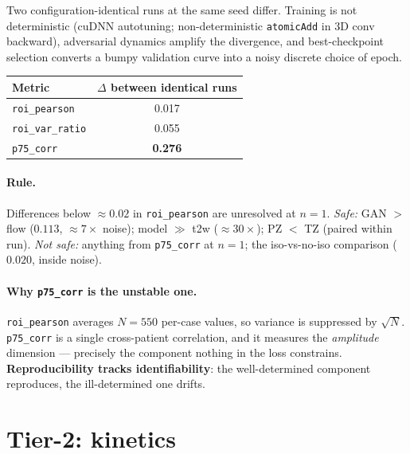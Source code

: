 \documentclass[11pt]{article}
\newcommand{\1}{\mathbb{1}}
\begin{document}
Two configuration-identical runs at the same seed differ. Training is not deterministic
(cuDNN autotuning; non-deterministic \texttt{atomicAdd} in 3D conv backward), adversarial
dynamics amplify the divergence, and best-checkpoint selection converts a bumpy validation
curve into a noisy discrete choice of epoch.

\begin{center}
\begin{tabular}{lc}
\toprule
Metric & $\Delta$ between identical runs \\
\midrule
\texttt{roi\_pearson} & 0.017 \\
\texttt{roi\_var\_ratio} & 0.055 \\
\texttt{p75\_corr} & \textbf{0.276} \\
\bottomrule
\end{tabular}
\end{center}

\paragraph{Rule.} Differences below $\approx0.02$ in \texttt{roi\_pearson} are unresolved at
$n=1$. \emph{Safe:} GAN $>$ flow ($0.113$, $\approx7\times$ noise); model $\gg$ t2w
($\approx30\times$); PZ $<$ TZ (paired within run). \emph{Not safe:} anything from
\texttt{p75\_corr} at $n=1$; the iso-vs-no-iso comparison ($0.020$, inside noise).

\paragraph{Why \texttt{p75\_corr} is the unstable one.} \texttt{roi\_pearson} averages $N=550$
per-case values, so variance is suppressed by $\sqrt{N}$. \texttt{p75\_corr} is a single
cross-patient correlation, and it measures the \emph{amplitude} dimension --- precisely the
component nothing in the loss constrains. \textbf{Reproducibility tracks identifiability}:
the well-determined component reproduces, the ill-determined one drifts.

\section{Tier-2: kinetics}
\end{document}

